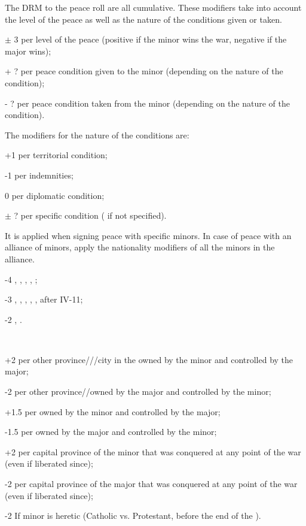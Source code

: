 \label{chPeace:peace minors modifiers}
The DRM to the peace roll are all cumulative.
 These modifiers take into account the level of
the peace as well as the nature of the conditions given or taken.
\begin{modlist}
\item[$\pm$ 3] per level of the peace (positive if the minor wins the war,
  negative if the major wins);
\item[+ ?] per peace condition given to the minor (depending on the nature of
  the condition);
\item[- ?] per peace condition taken from the minor (depending on the nature of
  the condition).
\end{modlist}
\bparag The modifiers for the nature of the conditions are:
\begin{modlist}
\item[+1] per territorial condition;
\item[-1] per indemnities;
\item[0] per diplomatic condition;
\item[$\pm$ ?] per specific condition ( if not specified).
\end{modlist}
It is applied when signing peace with specific minors. In case of peace with
an alliance of minors, apply the nationality modifiers of all the minors in
the alliance.
\begin{modlist}
\item[-4] , , , ,
;
\item[-3] , , , ,
,   after IV-11;
\item[-2] , .
\end{modlist}
~
\begin{modlist}
\item[+2] per other province/\TP\faceplus/\COL/city in the \ROTW owned by the
  minor and controlled by the major;
\item[-2] per other province/\TP\faceplus/\COL owned by the major and
  controlled by the minor;
\item[+1.5] per \TP\facemoins owned by the minor and controlled by the major;
\item[-1.5] per \TP\facemoins owned by the major and controlled by the minor;
\item[+2] per capital province of the minor that was conquered at any point of
  the war (even if liberated since);
\item[-2] per capital province of the major that was conquered at any point of
  the war (even if liberated since);
\item[-2] If minor is heretic (Catholic vs. Protestant, before the end of the
  ).
\end{modlist}
